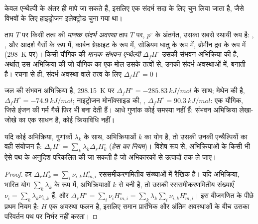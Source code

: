 केवल एन्थैल्पी के अंतर ही मापे जा सकते हैं, इसलिए एक संदर्भ सदा के लिए चुन
लिया जाता है, जैसे विभवों के लिए हाइड्रोजन इलेक्ट्रोड चुना गया था।

\begin{definition}\label{def:b2:reaction-enthalpy:formation}
ताप $T$ पर किसी तत्व की \emph{मानक संदर्भ अवस्था}
ताप $T$ पर, $p^\circ$ के अंतर्गत, उसका सबसे स्थायी रूप है:
, ,  और  आदर्श गैसों के रूप में, कार्बन
ग्रेफ़ाइट के रूप में, सोडियम धातु के रूप में, ब्रोमीन द्रव के रूप में (\qty{298}{K} पर)।
किसी यौगिक की \emph{मानक संभवन एन्थैल्पी}
$\Delta_f H^\circ$ उसकी संभवन अभिक्रिया की  है, अर्थात् उस अभिक्रिया की जो यौगिक का एक मोल उसके
तत्वों से, उनकी संदर्भ अवस्थाओं में, बनाती है। रचना से ही,
संदर्भ अवस्था वाले तत्व के लिए $\Delta_f H^\circ = 0$।
\end{definition}

\begin{example}[संभवन अभिक्रियाएँ]\label{ex:b2:reaction-enthalpy:formation}
जल की संभवन अभिक्रिया  है,
\qty{298.15}{K} पर $\Delta_f H^\circ = \qty{-285.83}{kJ/mol}$ के साथ;
मेथेन की  है, $\Delta_f H^\circ =
\qty{-74.9}{kJ/mol}$; नाइट्रोजन मोनॉक्साइड की, , $\Delta_f H^\circ = \qty{+90.3}{kJ/mol}$: एक  यौगिक,
जिसे इंजन की गर्म गैसें फिर भी बना देती हैं। आधे गुणांक कोई समस्या
नहीं हैं: संभवन अभिक्रिया लेखा-जोखे का एक साधन है, कोई
क्रियाविधि नहीं।
\end{example}

\begin{theorem}[हेस का नियम]\label{thm:b2:reaction-enthalpy:hess}
यदि कोई अभिक्रिया, गुणांकों $\lambda_k$ के साथ, अभिक्रियाओं $k$ का योग है,
तो उसकी  उनकी एन्थैल्पियों का वही संयोजन है:
$\Delta_r H^\circ = \sum_k\lambda_k\Delta_r H_k^\circ$
(\emph{हेस का नियम})। विशेष रूप से, 
अभिक्रियाओं के किसी भी ऐसे पथ के अनुदिश परिकलित की जा सकती है जो
अभिकारकों से उत्पादों तक ले जाए।
\end{theorem}

\begin{proof}
हर $\Delta_r H_k^\circ = \sum_i\nu_{i,k}H_{m,i}^\circ$ रससमीकरणमितीय
संख्याओं में रैखिक है। यदि अभिक्रिया, भारित योग $\sum_k\lambda_k$ के रूप में,
अभिक्रियाओं $k$ से बनी है, तो उसकी रससमीकरणमितीय संख्याएँ $\nu_i = \sum_k\lambda_k
\nu_{i,k}$ हैं, और $\Delta_r H^\circ = \sum_i\nu_iH_{m,i}^\circ = \sum_k\lambda_k
\sum_i\nu_{i,k}H_{m,i}^\circ$। इस बीजगणित के पीछे प्रथम नियम है: $H$ एक
अवस्था फलन है, इसलिए समान प्रारंभिक और अंतिम अवस्थाओं के बीच उसका परिवर्तन
पथ पर निर्भर नहीं करता।
\end{proof}

